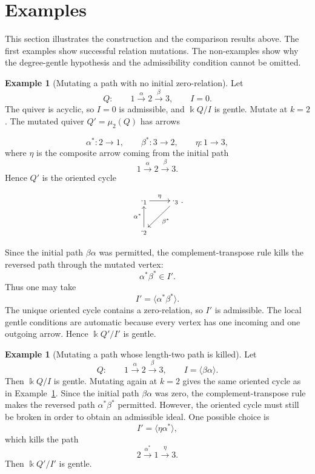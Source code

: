 \documentclass[11pt]{article}
\newcommand{\K}{\Bbbk}
\theoremstyle{plain}
\theoremstyle{definition}
\newtheorem{example}[theorem]{Example}
\theoremstyle{remark}
\begin{document}
\section{Examples}
\label{sec:examples}

This section illustrates the construction and the comparison results above.
The first examples show successful relation mutations.  The non-examples show
why the degree-gentle hypothesis and the admissibility condition cannot be
omitted.

\begin{example}[Mutating a path with no initial zero-relation]
\label{ex:pathzero}
Let
\[
  Q:
  \qquad
  1\xrightarrow{\alpha}2\xrightarrow{\beta}3,
  \qquad
  I=0.
\]
The quiver is acyclic, so \(I=0\) is admissible, and \(\K Q/I\) is gentle.
Mutate at \(k=2\).  The mutated quiver \(Q'=\mu_2(Q)\) has arrows




\[
  \alpha^*:2\to 1,
  \qquad
  \beta^*:3\to 2,
  \qquad
  \eta:1\to 3,
\]
where \(\eta\) is the composite arrow coming from the initial path
\[
  1\xrightarrow{\alpha}2\xrightarrow{\beta}3.
\]
Hence \(Q'\) is the oriented cycle

\begin{equation}\label{}
\nonumber   \xymatrix{
\cdot_{1} \ar[r]^{\eta} & \ar[dl]^{\beta^*}\cdot_{3}   \\
\cdot_{2}\ar[u]^{\alpha^*}}.
  \end{equation}

Since the initial path \(\beta\alpha\) was permitted, the complement-transpose rule
kills the reversed path through the mutated vertex:
\[
  \alpha^*\beta^*\in I'.
\]
Thus one may take
\[
  I'=\langle \alpha^*\beta^*\rangle.
\]
The unique oriented cycle contains a zero-relation, so \(I'\) is admissible.
The local gentle conditions are automatic because every vertex has one incoming
and one outgoing arrow.  Hence \(\K Q'/I'\) is gentle.
\end{example}

\begin{example}[Mutating a path whose length-two path is killed]
\label{ex:killed-path}
Let
\[
  Q:
  \qquad
  1\xrightarrow{\alpha}2\xrightarrow{\beta}3,
  \qquad
  I=\langle \beta\alpha\rangle.
\]
Then \(\K Q/I\) is gentle.  Mutating again at \(k=2\) gives the same oriented
cycle as in Example~\ref{ex:pathzero}.  Since the initial path \(\beta\alpha\) was
zero, the complement-transpose rule makes the reversed path
\(\alpha^*\beta^*\) permitted.  However, the oriented cycle must still be broken
in order to obtain an admissible ideal.  One possible choice is
\[
  I'=\langle \eta\alpha^*\rangle,
\]
which kills the path
\[
  2\xrightarrow{\alpha^*}1\xrightarrow{\eta}3.
\]
Then \(\K Q'/I'\) is gentle.
\end{example}
\end{document}
